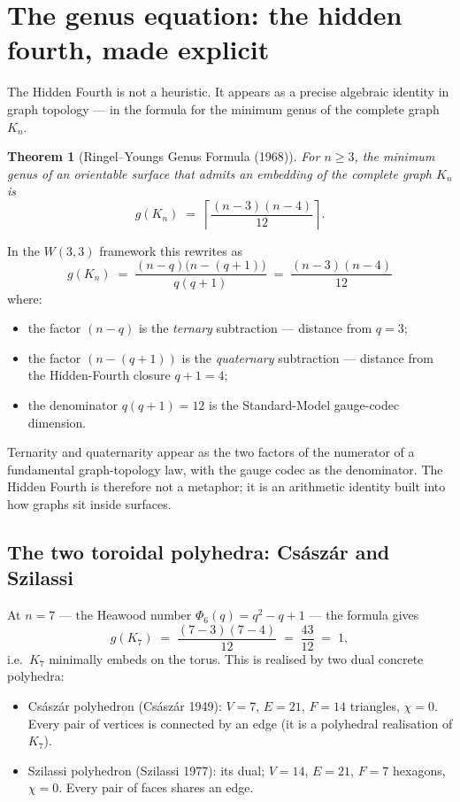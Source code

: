 \documentclass[11pt]{article}
\def\textbf#1{#1}%
\def\Phi#1{Phi#1}%
\def\cdot{ }%
\newtheorem*{theorem}{Theorem}
\begin{document}
\section{The genus equation: the hidden fourth, made explicit}

\label{sec:genus-equation}

The Hidden Fourth is not a heuristic. It appears as a precise algebraic identity in graph topology --- in the formula for the minimum genus of the complete graph $K_n$.

\begin{theorem}[Ringel--Youngs Genus Formula (1968)]
For $n \geq 3$, the minimum genus of an orientable surface that admits an embedding of the complete graph $K_n$ is
\[
g(K_n) \;=\; \left\lceil \frac{(n-3)(n-4)}{12} \right\rceil.
\]
\end{theorem}

In the $W(3,3)$ framework this rewrites as
\[
\boxed{\;
g(K_n) \;=\; \frac{(n-q)\bigl(n-(q+1)\bigr)}{q(q+1)} \;=\; \frac{(n-3)(n-4)}{12}
\;}
\]
where:
\begin{itemize}[leftmargin=2em]
\item the factor $(n - q)$ is the \emph{ternary} subtraction --- distance from $q = 3$;
\item the factor $(n - (q+1))$ is the \emph{quaternary} subtraction --- distance from the Hidden-Fourth closure $q+1 = 4$;
\item the denominator $q(q+1) = 12$ is the Standard-Model gauge-codec dimension.
\end{itemize}

\textbf{Ternarity and quaternarity appear as the two factors of the numerator of a fundamental graph-topology law, with the gauge codec as the denominator.} The Hidden Fourth is therefore not a metaphor; it is an arithmetic identity built into how graphs sit inside surfaces.

\subsection*{The two toroidal polyhedra: Császár and Szilassi}

At $n = 7$ --- the Heawood number $\Phi_6(q) = q^2 - q + 1$ --- the formula gives
\[
g(K_7) \;=\; \frac{(7-3)(7-4)}{12} \;=\; \frac{4 \cdot 3}{12} \;=\; 1,
\]
i.e.\ $K_7$ minimally embeds on the torus. This is realised by two dual concrete polyhedra:

\begin{itemize}[leftmargin=2em]
\item \textbf{Császár polyhedron} (Csász\'ar 1949): $V = 7$, $E = 21$, $F = 14$ triangles, $\chi = 0$. Every pair of vertices is connected by an edge (it is a polyhedral realisation of $K_7$).
\item \textbf{Szilassi polyhedron} (Szilassi 1977): its dual; $V = 14$, $E = 21$, $F = 7$ hexagons, $\chi = 0$. Every pair of faces shares an edge.
\end{itemize}
\end{document}
